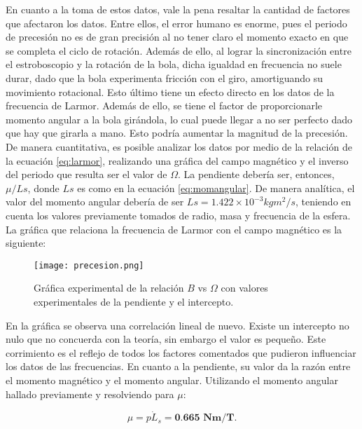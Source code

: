 \documentclass[%
 reprint,
 amsmath,amssymb,
 aps,
]{revtex4-1}
\begin{document}
En cuanto a la toma de estos datos, vale la pena resaltar la cantidad de factores que afectaron los datos. Entre ellos, el error humano es enorme, pues el periodo de precesión no es de gran precisión al no tener claro el momento exacto en que se completa el ciclo de rotación. Además de ello, al lograr la sincronización entre el estroboscopio y la rotación de la bola, dicha igualdad en frecuencia no suele durar, dado que la bola experimenta fricción con el giro, amortiguando su movimiento rotacional. Esto último tiene un efecto directo en los datos de la frecuencia de Larmor. Además de ello, se tiene el factor de proporcionarle momento angular a la bola girándola, lo cual puede llegar a no ser perfecto dado que hay que girarla a mano. Esto podría aumentar la magnitud de la precesión.\\
De manera cuantitativa, es posible analizar los datos por medio de la relación de la ecuación \ref{eq:larmor}, realizando una gráfica del campo magnético y el inverso del periodo que resulta ser el valor de $\Omega$. La pendiente debería ser, entonces, $\mu/Ls$, donde $Ls$ es como en la ecuación \ref{eq:momangular}. De manera analítica, el valor del momento angular debería de ser $Ls=1.422\times 10^{-3} kgm^2/s$, teniendo en cuenta los valores previamente tomados de radio, masa y frecuencia de la esfera. La gráfica que relaciona la frecuencia de Larmor con el campo magnético es la siguiente:

\begin{figure}[H]
    \centering
    \texttt{[image: precesion.png]}
    \caption{Gráfica experimental de la relación $B$ vs $\Omega$ con valores experimentales de la pendiente y el intercepto.}
    \label{fig:grafica3}
\end{figure}

En la gráfica se observa una correlación lineal de nuevo. Existe un intercepto no nulo que no concuerda con la teoría, sin embargo el valor es pequeño. Este corrimiento es el reflejo de todos los factores comentados que pudieron influenciar los datos de las frecuencias. En cuanto a la pendiente, su valor da la razón entre el momento magnético y el momento angular. Utilizando el momento angular hallado previamente y resolviendo para $\mu$:

\begin{equation*}
    \mu = p \dot L_s = \textbf{0.665 Nm/T}.
\end{equation*}
\end{document}
